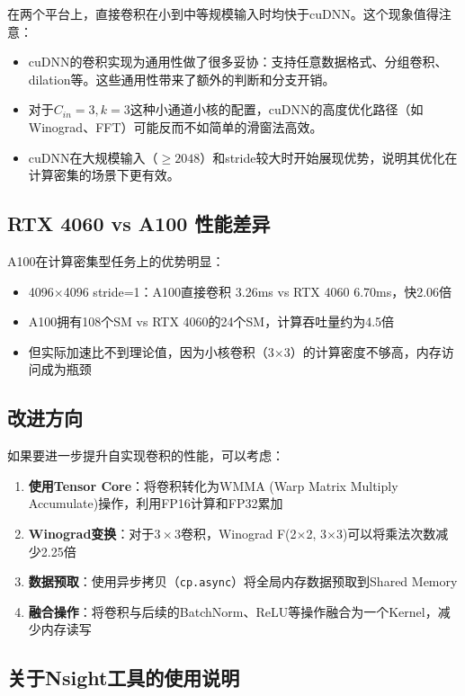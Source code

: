 \documentclass[a4paper]{article}
\begin{document}
在两个平台上，直接卷积在小到中等规模输入时均快于cuDNN。这个现象值得注意：

\begin{itemize}
    \item cuDNN的卷积实现为通用性做了很多妥协：支持任意数据格式、分组卷积、dilation等。这些通用性带来了额外的判断和分支开销。
    \item 对于$C_{in}=3, k=3$这种小通道小核的配置，cuDNN的高度优化路径（如Winograd、FFT）可能反而不如简单的滑窗法高效。
    \item cuDNN在大规模输入（$\geq 2048$）和stride较大时开始展现优势，说明其优化在计算密集的场景下更有效。
\end{itemize}

\subsection{RTX 4060 vs A100 性能差异}

A100在计算密集型任务上的优势明显：
\begin{itemize}
    \item 4096$\times$4096 stride=1：A100直接卷积 3.26ms vs RTX 4060 6.70ms，快2.06倍
    \item A100拥有108个SM vs RTX 4060的24个SM，计算吞吐量约为4.5倍
    \item 但实际加速比不到理论值，因为小核卷积（3$\times$3）的计算密度不够高，内存访问成为瓶颈
\end{itemize}

\subsection{改进方向}

如果要进一步提升自实现卷积的性能，可以考虑：
\begin{enumerate}
    \item \textbf{使用Tensor Core}：将卷积转化为WMMA (Warp Matrix Multiply Accumulate)操作，利用FP16计算和FP32累加
    \item \textbf{Winograd变换}：对于$3\times 3$卷积，Winograd F(2$\times$2, 3$\times$3)可以将乘法次数减少2.25倍
    \item \textbf{数据预取}：使用异步拷贝（\texttt{cp.async}）将全局内存数据预取到Shared Memory
    \item \textbf{融合操作}：将卷积与后续的BatchNorm、ReLU等操作融合为一个Kernel，减少内存读写
\end{enumerate}

\subsection{关于Nsight工具的使用说明}
\end{document}
